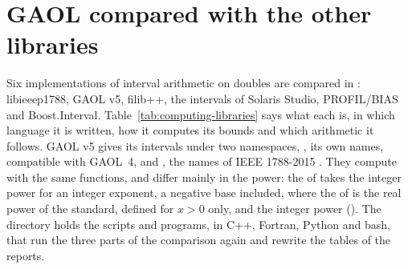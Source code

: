 \section{GAOL compared with the other libraries}
\label{sec:comparison}
%
%

Six implementations of interval arithmetic on doubles are compared in
: libieeep1788, GAOL v5, filib++, the intervals of
Solaris Studio, PROFIL/BIAS and Boost.Interval.
Table~\ref{tab:computing-libraries} says what each is, in which language it
is written, how it computes its bounds and which arithmetic it follows.
GAOL v5 gives its intervals under two namespaces, , its own
names, compatible with GAOL~4, and , the names of IEEE
1788-2015 \cite{IEEE1788:2015}. They compute with the same functions, and
differ mainly in the power: the  of  takes the integer
power for an integer exponent, a negative base included, where the
 of  is the real power of the standard,
defined for $x > 0$ only, and  the integer power
(). The directory  holds
the scripts and programs, in C++, Fortran, Python and bash, that run the
three parts of the comparison again and rewrite the tables of the reports.

